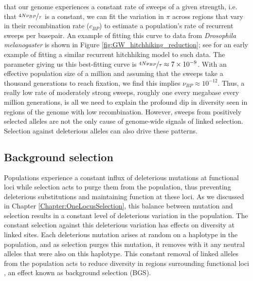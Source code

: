 that our genome experiences a constant rate of sweeps of a given
strength, i.e. that $\nicefrac{4N\nu_{BP}}{ \tau}$ is a constant, we can fit the
variation in $\pi$ across regions that vary in their recombination
rate ($c_{BP}$) to estimate a population's rate of recurrent sweeps per basepair.  An example of fitting this curve to data from
{\it Drosophila melanogaster} is shown in Figure
\ref{fig:GW_hitchhiking_reduction}; see \citet{wiehe1993analysis} for
an early example of fitting a similar recurrent hitchhiking model to such data. The parameter giving us this
best-fitting curve is $\nicefrac{4N\nu_{BP}}{ \tau} \approx 7 \times 10^{-9}$. With an
  effective population size of a million  and assuming that the sweeps take
  a thousand generations to reach fixation, we find this implies
  $\nu_{BP} \approx 10^{-12}$. Thus, a really low rate of
  moderately strong sweeps, roughly one every megabase every million
  generations, is all we need to explain the profound dip in diversity seen in regions
  of the genome with low recombination. However, sweeps from positively selected
  alleles are not the only cause of genome-wide signals of linked
  selection. Selection against deleterious alleles can also drive these
  patterns.    

\subsection{Background selection}

Populations experience a constant influx of
deleterious mutations at functional loci while selection acts to purge
them from the population, thus preventing deleterious substitutions and maintaining function at these loci. As
we discussed in Chapter \ref{Chapter:OneLocusSelection}, this balance between mutation and selection results
in a constant level of deleterious variation in the population. The
constant selection against this deleterious variation has effects on diversity at linked
sites. Each deleterious mutation arises at random on a haplotype in the
population, and as selection purges this mutation, it removes with it any neutral alleles that were also on this
haplotype. This constant removal of linked alleles from the population
acts to reduce diversity in regions surrounding functional loci
\citep{Hudson:95b,Nordborg:96}, an effect known as background
selection (BGS).

